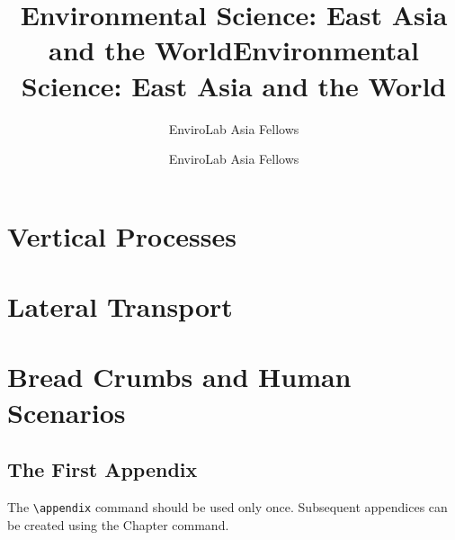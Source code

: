 \documentclass{book}%
\title{Environmental Science: East Asia and the World}
\author{EnviroLab Asia Fellows}
\title{Environmental Science: East Asia and the World}
\author{EnviroLab Asia Fellows}
\begin{document}
\frontmatter

\maketitle
\tableofcontents




\mainmatter
\part{Vertical Processes}















\part{Lateral Transport}








\part{Bread Crumbs and Human Scenarios}







\appendix

\chapter{The First Appendix}

The \verb"\appendix" command should be used only once. Subsequent appendices can
be created using the Chapter command.
\end{document}
